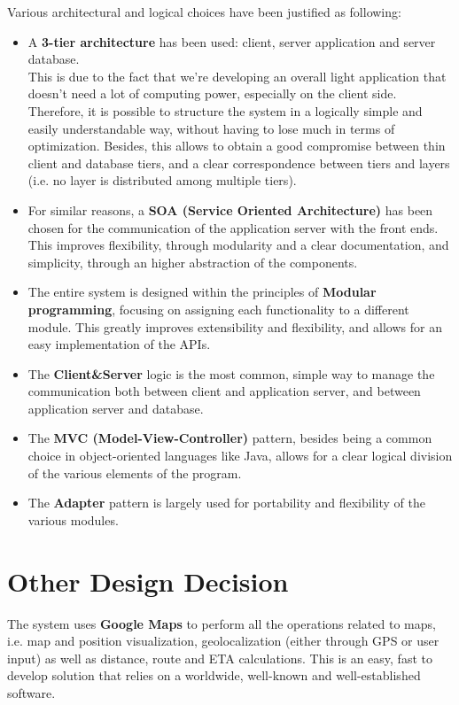 Various architectural and logical choices have been justified as following:

\begin{itemize}

	\item A \textbf{3-tier architecture} has been used: client, server application and server database.\\
	This is due to the fact that we're developing an overall light application that doesn't need a lot of computing power, especially on the client side. Therefore, it is possible to structure the system in a logically simple and easily understandable way, without having to lose much in terms of optimization. Besides, this allows to obtain a good compromise between thin client and database tiers, and a clear correspondence between tiers and layers (i.e. no layer is distributed among multiple tiers).

	\item For similar reasons, a \textbf{SOA (Service Oriented Architecture)} has been chosen for the communication of the application server with the front ends. This improves flexibility, through modularity and a clear documentation, and simplicity, through an higher abstraction of the components.

	\item The entire system is designed within the principles of \textbf{Modular programming}, focusing on assigning each functionality to a different module. This greatly improves extensibility and flexibility, and allows for an easy implementation of the APIs.

	\item The \textbf{Client\&Server} logic is the most common, simple way to manage the communication both between client and application server, and between application server and database.

	\item The \textbf{MVC (Model-View-Controller)} pattern, besides being a common choice in object-oriented languages like Java, allows for a clear logical division of the various elements of the program.

	\item The \textbf{Adapter} pattern is largely used for portability and flexibility of the various modules.

\end{itemize}

\section{Other Design Decision}
The system uses \textbf{Google Maps} to perform all the operations related to maps, i.e. map and position visualization, geolocalization (either through GPS or user input) as well as distance, route and ETA calculations. This is an easy, fast to develop solution that relies on a worldwide, well-known and well-established software.
